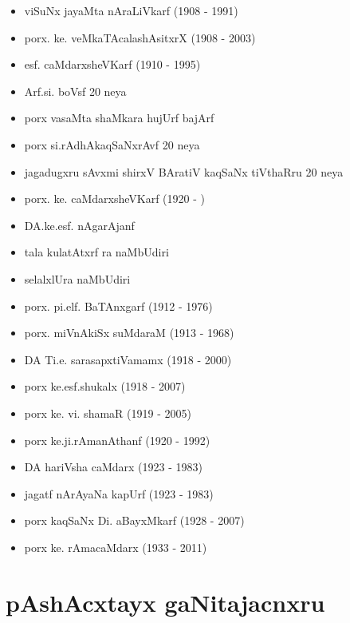 {\begin{itemize}
\item viSuNx jayaMta nAraLiVkarf {\rm (1908 - 1991)}
\item porx. ke. veMkaTAcalashAsitxrX {\rm (1908 - 2003)}
\item esf. caMdarxsheVKarf {\rm (1910 - 1995)}
\item Arf.si. boVsf {\rm 20} neya 
\item porx vasaMta shaMkara hujUrf bajArf
\item porx si.rAdhAkaqSaNxrAvf {\rm 20} neya
\item jagadugxru sAvxmi shirxV BAratiV kaqSaNx tiVthaRru {\rm 20} neya
\item porx. ke. caMdarxsheVKarf {\rm (1920 - )}
\item DA.ke.esf. nAgarAjanf
\item tala kulatAtxrf ra naMbUdiri
\item selalxlUra naMbUdiri
\item porx. pi.elf. BaTAnxgarf {\rm (1912 - 1976)}
\item porx. miVnAkiSx suMdaraM {\rm (1913 - 1968)}
\item DA Ti.e. sarasapxtiVamamx {\rm (1918 - 2000)}
\item porx ke.esf.shukalx {\rm (1918 - 2007)}
\item porx ke. vi.  shamaR {\rm (1919 - 2005)}
\item porx ke.ji.rAmanAthanf {\rm (1920 - 1992)}
\item DA hariVsha caMdarx {\rm (1923 - 1983)}
\item jagatf nArAyaNa kapUrf {\rm (1923 - 1983)}
\item porx kaqSaNx Di. aBayxMkarf {\rm (1928 - 2007)}
\item porx ke. rAmacaMdarx {\rm (1933 - 2011)}
\end{itemize}}

\section*{pAshAcxtayx gaNitajacnxru}


